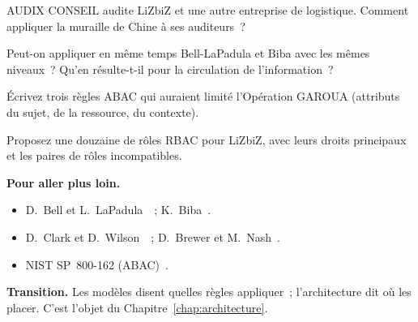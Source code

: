 \begin{boxexo}[title={\ding{45}\quad Exercice~13.7. Muraille de Chine \niveaumoyen}]
AUDIX CONSEIL audite LiZbiZ et une autre entreprise de logistique.
Comment appliquer la muraille de Chine à ses auditeurs~?
\end{boxexo}

\begin{boxexo}[title={\ding{45}\quad Exercice~13.8. Les deux propriétés \niveaumoyen}]
Peut-on appliquer en même temps Bell-LaPadula et Biba avec les mêmes
niveaux~? Qu'en résulte-t-il pour la circulation de l'information~?
\end{boxexo}

\begin{boxexo}[title={\ding{45}\quad Exercice~13.9. Une règle ABAC \niveauexpert}]
Écrivez trois règles ABAC qui auraient limité l'Opération GAROUA (attributs
du sujet, de la ressource, du contexte).
\end{boxexo}

\begin{boxexo}[title={\ding{45}\quad Exercice~13.10. Des rôles pour LiZbiZ \niveauexpert}]
Proposez une douzaine de rôles RBAC pour LiZbiZ, avec leurs droits
principaux et les paires de rôles incompatibles.
\end{boxexo}

\bigskip

\begin{boxinfo}
\textbf{Pour aller plus loin.}
\begin{itemize}
    \item D.~Bell et L.~LaPadula~\cite{bell1976}~; K.~Biba~\cite{biba1977}.
    \item D.~Clark et D.~Wilson~\cite{clark1987}~; D.~Brewer et
          M.~Nash~\cite{brewer1989}.
    \item NIST SP~800-162 (ABAC)~\cite{nist800162}.
\end{itemize}
\end{boxinfo}

\begin{boxinfo}
\textbf{Transition.} Les modèles disent quelles règles appliquer~;
l'architecture dit où les placer. C'est l'objet du
Chapitre~\ref{chap:architecture}.
\end{boxinfo}
